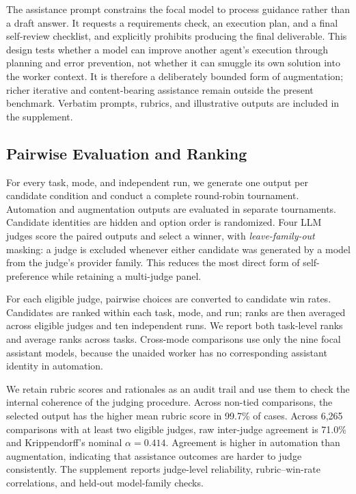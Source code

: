 The assistance prompt constrains the focal model to process guidance rather
than a draft answer. It requests a requirements check, an execution plan, and
a final self-review checklist, and explicitly prohibits producing the final
deliverable. This design tests whether a model can improve another agent's
execution through planning and error prevention, not whether it can smuggle
its own solution into the worker context. It is therefore a deliberately
bounded form of augmentation; richer iterative and content-bearing assistance
remain outside the present benchmark. Verbatim prompts, rubrics, and
illustrative outputs are included in the supplement.

\subsection{Pairwise Evaluation and Ranking}

For every task, mode, and independent run, we generate one output per
candidate condition and conduct a complete round-robin tournament. Automation
and augmentation outputs are evaluated in separate tournaments. Candidate
identities are hidden and option order is randomized. Four LLM judges score
the paired outputs and select a winner, with \emph{leave-family-out} masking:
a judge is excluded whenever either candidate was generated by a model from
the judge's provider family. This reduces the most direct form of
self-preference while retaining a multi-judge panel.

For each eligible judge, pairwise choices are converted to candidate win
rates. Candidates are ranked within each task, mode, and run; ranks are then
averaged across eligible judges and ten independent runs. We report both
task-level ranks and average ranks across tasks. Cross-mode comparisons use
only the nine focal assistant models, because the unaided worker has no
corresponding assistant identity in automation.

We retain rubric scores and rationales as an audit trail and use them to check
the internal coherence of the judging procedure. Across non-tied comparisons,
the selected output has the higher mean rubric score in 99.7\% of cases.
Across 6,265 comparisons with at least two eligible judges, raw inter-judge
agreement is 71.0\% and Krippendorff's nominal
$\alpha=0.414$. Agreement is higher in automation than augmentation, indicating
that assistance outcomes are harder to judge consistently. The supplement
reports judge-level reliability, rubric--win-rate correlations, and held-out
model-family checks.
